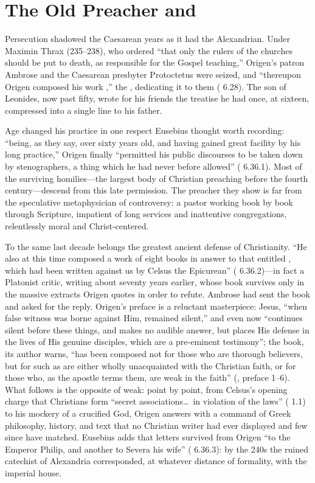 \section{The Old Preacher and }

Persecution shadowed the Caesarean years as it had the Alexandrian. Under
Maximin Thrax (235--238), who ordered ``that only the rulers of the churches
should be put to death, as responsible for the Gospel teaching,'' Origen's
patron Ambrose and the Caesarean presbyter Protoctetus were seized, and
``thereupon Origen composed his work ,'' the
, dedicating it to them ( 6.28). The son of Leonides, now past fifty, wrote for his friends
the treatise he had once, at sixteen, compressed into a single line to his
father.

Age changed his practice in one respect Eusebius thought worth recording:
``being, as they say, over sixty years old, and having gained great facility
by his long practice,'' Origen finally ``permitted his public discourses to
be taken down by stenographers, a thing which he had never before allowed''
( 6.36.1). Most of the surviving homilies---the largest
body of Christian preaching before the fourth century---descend from this
late permission. The preacher they show is far from the speculative
metaphysician of controversy: a pastor working book by book through
Scripture, impatient of long services and inattentive congregations,
relentlessly moral and Christ-centered.

To the same last decade belongs the greatest ancient defense of
Christianity. ``He also at this time composed a work of eight books in
answer to that entitled , which had been written
against us by Celsus the Epicurean'' ( 6.36.2)---in
fact a Platonist critic, writing about seventy years earlier, whose book
survives only in the massive extracts Origen quotes in order to refute.
Ambrose had sent the book and asked for the reply. Origen's preface is a
reluctant masterpiece: Jesus, ``when false witness was borne against Him,
remained silent,'' and even now ``continues silent before these things, and
makes no audible answer, but places His defense in the lives of His genuine
disciples, which are a pre-eminent testimony''; the book, its author warns,
``has been composed not for those who are thorough believers, but for such
as are either wholly unacquainted with the Christian faith, or for those
who, as the apostle terms them, are weak in the faith'' (, preface 1--6). What follows is the opposite of weak: point by point, from
Celsus's opening charge that Christians form ``secret associations\ldots\
in violation of the laws'' ( 1.1) to his mockery of a
crucified God, Origen answers with a command of Greek philosophy, history,
and text that no Christian writer had ever displayed and few since have
matched. Eusebius adds that letters survived from Origen ``to the Emperor
Philip, and another to Severa his wife'' (\work{Church History} 6.36.3):
by the 240s the ruined catechist of Alexandria corresponded, at whatever
distance of formality, with the imperial house.

